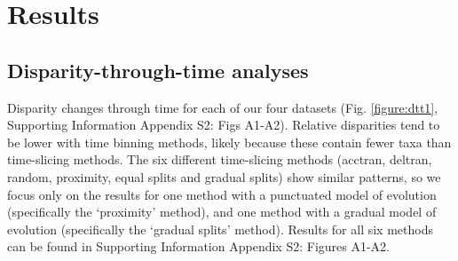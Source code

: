 \documentclass[12pt,a4paper]{article}
\begin{document}
\section{Results} 

\subsection{Disparity-through-time analyses}

Disparity changes through time for each of our four datasets (Fig. \ref{figure:dtt1}, Supporting Information Appendix S2: Figs A1-A2). 
Relative disparities tend to be lower with time binning methods, likely because these contain fewer taxa than time-slicing methods.
The six different time-slicing methods (acctran, deltran, random, proximity, equal splits and gradual splits) show similar patterns, so we focus only on the results for one method with a punctuated model of evolution (specifically the `proximity' method), and one method with a gradual model of evolution (specifically the `gradual splits' method).
Results for all six methods can be found in Supporting Information Appendix S2: Figures A1-A2.
\end{document}
